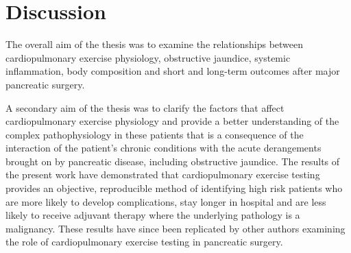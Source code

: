 
\chapter{Discussion}
\label{ch_discussion}


\clearpage

The overall aim of the thesis was to examine the relationships between cardiopulmonary exercise physiology, obstructive jaundice, systemic inflammation, body composition and short and long-term outcomes after major pancreatic surgery. 

A secondary aim of the thesis was to clarify the factors that affect cardiopulmonary exercise physiology and provide a better understanding of the complex pathophysiology in these patients that is a consequence of the interaction of the patient's chronic conditions with the acute derangements brought on by pancreatic disease, including obstructive jaundice.
The results of the present work have demonstrated that cardiopulmonary exercise testing provides an objective, reproducible method of identifying high risk patients who are more likely to develop complications, stay longer in hospital and are less likely to receive adjuvant therapy where the underlying pathology is a malignancy. These results have since been replicated by other authors examining the role of cardiopulmonary exercise testing in pancreatic surgery. \parencite{ausania_effects_2012, ausania_double_2012, junejo_cardiopulmonary_2014}

